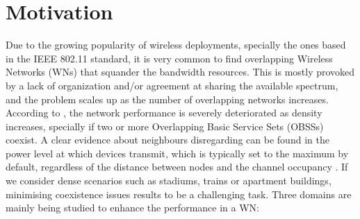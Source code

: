 \documentclass[12pt, a4paper,twoside]{tesi_upf}
\begin{document}
		\section{Motivation}
		\label{section:motivation}
			Due to the growing popularity of wireless deployments, specially the ones based in the IEEE 802.11 standard, it is very common to find overlapping Wireless Networks (WNs) that squander the bandwidth resources. This is mostly provoked by a lack of organization and/or agreement at sharing the available spectrum, and the problem scales up as the number of overlapping networks increases. According to \cite{zhong2015issues}, the network performance is severely deteriorated as density increases, specially if two or more Overlapping Basic Service Sets (OBSSs) coexist. A clear evidence about neighbours disregarding can be found in the power level at which devices transmit, which is typically set to the maximum by default, regardless of the distance between nodes and the channel occupancy \cite{akella2007self}. If we consider dense scenarios such as stadiums, trains or apartment buildings, minimising coexistence issues results to be a challenging task. Three domains are mainly being studied to enhance the performance in a WN:
\end{document}
